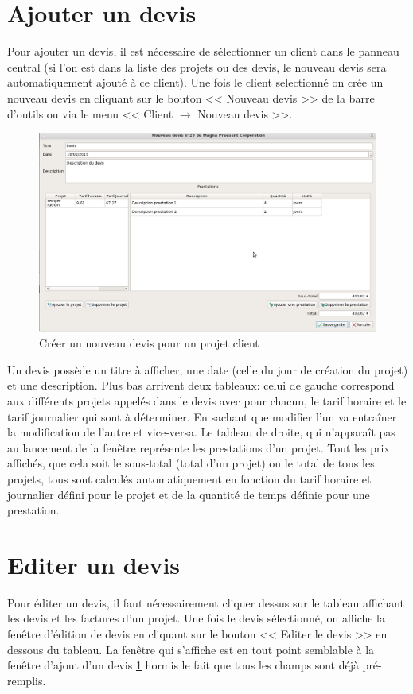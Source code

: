 \section{Ajouter un devis}
\label{ch:ajoutDevis}
Pour ajouter un devis, il est nécessaire de sélectionner un client dans le panneau central (si l'on est dans la liste des projets ou des devis, le nouveau devis sera automatiquement ajouté à ce client). Une fois le client selectionné on crée un nouveau devis en cliquant sur le bouton << Nouveau devis >> de la barre d'outils ou via le menu << Client $\rightarrow$ Nouveau devis >>. 
\begin{figure}[H]
	\centering
	\includegraphics[width=17cm]{screens/creerDevis.png}
	\caption{Créer un nouveau devis pour un projet client}
	\label{fig:creerDevis}
\end{figure}
Un devis possède un titre à afficher, une date (celle du jour de création du projet) et une description. Plus bas arrivent deux tableaux: celui de gauche correspond aux différents projets appelés dans le devis avec pour chacun, le tarif horaire et le tarif journalier qui sont à déterminer. En sachant que modifier l'un va entraîner la modification de l'autre et vice-versa. Le tableau de droite, qui n'apparaît pas au lancement de la fenêtre représente les prestations d'un projet. Tout les prix affichés, que cela soit le sous-total (total d'un projet) ou le total de tous les projets, tous sont calculés automatiquement en fonction du tarif horaire et journalier défini pour le projet et de la quantité de temps définie pour une prestation. 
\section{Editer un devis}
Pour éditer un devis, il faut nécessairement cliquer dessus sur le tableau affichant les devis et les factures d'un projet. Une fois le devis sélectionné, on affiche la fenêtre d'édition de devis en cliquant sur le bouton << Editer le devis >> en dessous du tableau.
La fenêtre qui s'affiche est en tout point semblable à la fenêtre d'ajout d'un devis \ref{fig:creerDevis} hormis le fait que tous les champs sont déjà pré-remplis.

